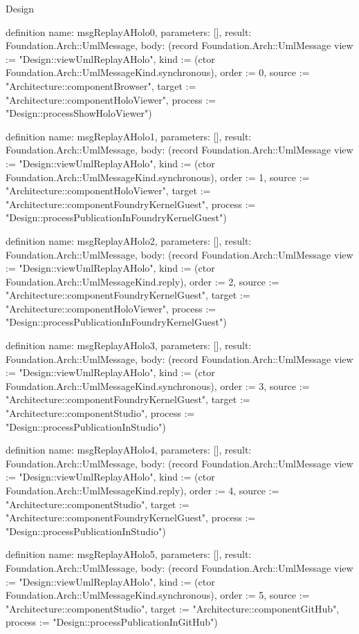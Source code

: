 \begin{lexlean}{Design}
\begin{semanticmodule}
definition{
  name: msgReplayAHolo0,
  parameters: [],
  result: Foundation.Arch::UmlMessage,
  body: (record Foundation.Arch::UmlMessage {view := "Design::viewUmlReplayAHolo", kind := (ctor Foundation.Arch::UmlMessageKind.synchronous), order := 0, source := "Architecture::componentBrowser", target := "Architecture::componentHoloViewer", process := "Design::processShowHoloViewer"})
}

definition{
  name: msgReplayAHolo1,
  parameters: [],
  result: Foundation.Arch::UmlMessage,
  body: (record Foundation.Arch::UmlMessage {view := "Design::viewUmlReplayAHolo", kind := (ctor Foundation.Arch::UmlMessageKind.synchronous), order := 1, source := "Architecture::componentHoloViewer", target := "Architecture::componentFoundryKernelGuest", process := "Design::processPublicationInFoundryKernelGuest"})
}

definition{
  name: msgReplayAHolo2,
  parameters: [],
  result: Foundation.Arch::UmlMessage,
  body: (record Foundation.Arch::UmlMessage {view := "Design::viewUmlReplayAHolo", kind := (ctor Foundation.Arch::UmlMessageKind.reply), order := 2, source := "Architecture::componentFoundryKernelGuest", target := "Architecture::componentHoloViewer", process := "Design::processPublicationInFoundryKernelGuest"})
}

definition{
  name: msgReplayAHolo3,
  parameters: [],
  result: Foundation.Arch::UmlMessage,
  body: (record Foundation.Arch::UmlMessage {view := "Design::viewUmlReplayAHolo", kind := (ctor Foundation.Arch::UmlMessageKind.synchronous), order := 3, source := "Architecture::componentFoundryKernelGuest", target := "Architecture::componentStudio", process := "Design::processPublicationInStudio"})
}

definition{
  name: msgReplayAHolo4,
  parameters: [],
  result: Foundation.Arch::UmlMessage,
  body: (record Foundation.Arch::UmlMessage {view := "Design::viewUmlReplayAHolo", kind := (ctor Foundation.Arch::UmlMessageKind.reply), order := 4, source := "Architecture::componentStudio", target := "Architecture::componentFoundryKernelGuest", process := "Design::processPublicationInStudio"})
}

definition{
  name: msgReplayAHolo5,
  parameters: [],
  result: Foundation.Arch::UmlMessage,
  body: (record Foundation.Arch::UmlMessage {view := "Design::viewUmlReplayAHolo", kind := (ctor Foundation.Arch::UmlMessageKind.synchronous), order := 5, source := "Architecture::componentStudio", target := "Architecture::componentGitHub", process := "Design::processPublicationInGitHub"})
}


\end{semanticmodule}
\end{lexlean}
